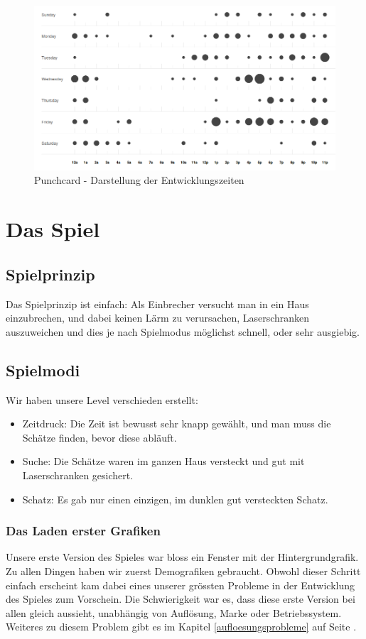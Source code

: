 \documentclass[11pt,a4paper]{scrbook}
\begin{document}
\begin{figure}[h]
\centering
\includegraphics[scale=0.4]{img/punchcard.png}
\caption{Punchcard - Darstellung der Entwicklungszeiten}
\label{fig:punchcard}
\end{figure}

\chapter{Das Spiel}
\section{Spielprinzip}
Das Spielprinzip ist einfach: Als Einbrecher versucht man in ein Haus einzubrechen, und dabei keinen Lärm zu verursachen, Laserschranken auszuweichen
und dies je nach Spielmodus möglichst schnell, oder sehr ausgiebig.

\section{Spielmodi}
Wir haben unsere Level verschieden erstellt:
\begin{itemize}
\item Zeitdruck: Die Zeit ist bewusst sehr knapp gewählt, und man muss die Schätze finden, bevor diese abläuft.
\item Suche: Die Schätze waren im ganzen Haus versteckt und gut mit Laserschranken gesichert.
\item Schatz: Es gab nur einen einzigen, im dunklen gut versteckten Schatz.
\end{itemize}

\subsection{Das Laden erster Grafiken}
Unsere erste Version des Spieles war bloss ein Fenster mit der Hintergrundgrafik.
Zu allen Dingen haben wir zuerst Demografiken gebraucht.
Obwohl dieser Schritt einfach erscheint kam dabei eines unserer grössten Probleme in der Entwicklung des Spieles zum Vorschein.
Die Schwierigkeit war es, dass diese erste Version bei allen gleich aussieht, unabhängig von Auflösung, Marke oder Betriebssystem.
Weiteres zu diesem Problem gibt es im Kapitel \ref{aufloesungsprobleme} auf Seite \pageref{aufloesungsprobleme}.
\end{document}
